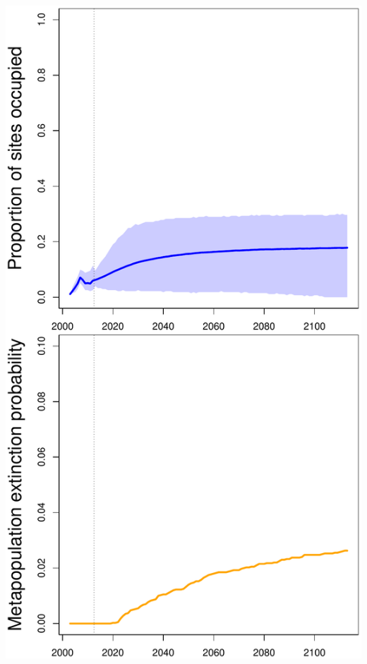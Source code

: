 \documentclass[color=usenames,dvipsnames]{beamer}
\begin{document}
\begin{frame}
\begin{columns}
\begin{column}{0.4\textwidth}
\begin{center}
        \includegraphics[width=\textwidth]{figs/proj-ext-JAPPL}
      \end{center}
    \end{column}
  \end{columns}
\end{frame}




\end{document}
